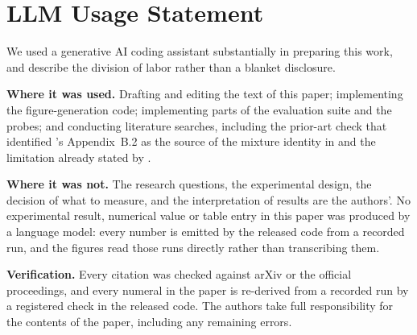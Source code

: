 \section*{LLM Usage Statement}

We used a generative AI coding assistant substantially in preparing this work,
and describe the division of labor rather than a blanket disclosure.

\textbf{Where it was used.} Drafting and editing the text of this paper;
implementing the figure-generation code; implementing parts of the evaluation
suite and the probes; and conducting literature
searches, including the prior-art check that identified
\citet{binkowski2018kid}'s Appendix~B.2 as the source of the mixture identity in
 and the limitation already stated by
\citet{merino2026dreamcubed}.

\textbf{Where it was not.} The research questions, the experimental design, the
decision of what to measure, and the interpretation of results are the authors'.
No experimental result, numerical value or table entry in this paper was
produced by a language model: every number is emitted by the released code from
a recorded run, and the figures read those runs directly rather than
transcribing them.

\textbf{Verification.} Every citation was checked against arXiv or the official
proceedings, and every numeral in the paper is re-derived from a recorded run by a
registered check in the released code. The authors take full responsibility for the
contents of the paper, including any remaining errors.

